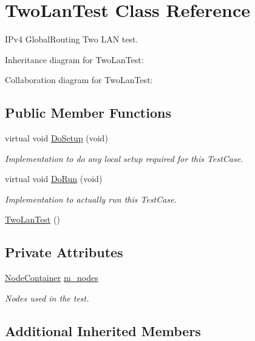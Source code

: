 \hypertarget{classTwoLanTest}{}\section{Two\+Lan\+Test Class Reference}
\label{classTwoLanTest}


I\+Pv4 Global\+Routing Two L\+AN test.  




Inheritance diagram for Two\+Lan\+Test\+:


Collaboration diagram for Two\+Lan\+Test\+:
\subsection*{Public Member Functions}
\begin{DoxyCompactItemize}
\item 
virtual void \hyperlink{classTwoLanTest_acfc905a31b5767f6d74747593127dfe4}{Do\+Setup} (void)
\begin{DoxyCompactList}\small\item\em Implementation to do any local setup required for this Test\+Case. \end{DoxyCompactList}\item 
virtual void \hyperlink{classTwoLanTest_a1bca3b0b7ce5e1592dffe64835b602b2}{Do\+Run} (void)
\begin{DoxyCompactList}\small\item\em Implementation to actually run this Test\+Case. \end{DoxyCompactList}\item 
\hyperlink{classTwoLanTest_a1f9318a3615c094af89567ea4b1714b7}{Two\+Lan\+Test} ()
\end{DoxyCompactItemize}
\subsection*{Private Attributes}
\begin{DoxyCompactItemize}
\item 
\hyperlink{classns3_1_1NodeContainer}{Node\+Container} \hyperlink{classTwoLanTest_a6f71e9cc2b2a77a02f031abe9467b74c}{m\+\_\+nodes}
\begin{DoxyCompactList}\small\item\em Nodes used in the test. \end{DoxyCompactList}\end{DoxyCompactItemize}
\subsection*{Additional Inherited Members}


